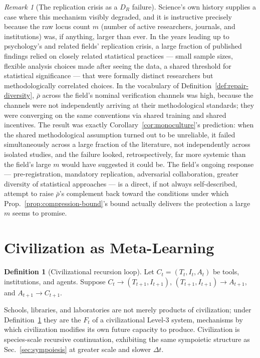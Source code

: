 \documentclass[12pt,a4paper]{article}
\theoremstyle{plain}
\theoremstyle{definition}
\newtheorem{definition}[theorem]{Definition}
\theoremstyle{remark}
\newtheorem{remark}[theorem]{Remark}
\newcommand{\DR}{D_R}
\begin{document}
\begin{remark}[The replication crisis as a $\DR$ failure]
\label{rem:replication-crisis}
Science's own history supplies a case where this mechanism visibly degraded, and it is instructive precisely because the raw locus count $m$ (number of active researchers, journals, and institutions) was, if anything, larger than ever. In the years leading up to psychology's and related fields' replication crisis, a large fraction of published findings relied on closely related statistical practices — small sample sizes, flexible analysis choices made after seeing the data, a shared threshold for statistical significance — that were formally distinct researchers but methodologically correlated choices. In the vocabulary of Definition~\ref{def:repair-diversity}, $\bar\rho$ across the field's nominal verification channels was high, because the channels were not independently arriving at their methodological standards; they were converging on the same conventions via shared training and shared incentives. The result was exactly Corollary~\ref{cor:monoculture}'s prediction: when the shared methodological assumption turned out to be unreliable, it failed simultaneously across a large fraction of the literature, not independently across isolated studies, and the failure looked, retrospectively, far more systemic than the field's large $m$ would have suggested it could be. The field's ongoing response — pre-registration, mandatory replication, adversarial collaboration, greater diversity of statistical approaches — is a direct, if not always self-described, attempt to raise $\bar\rho$'s complement back toward the conditions under which Prop.~\ref{prop:compression-bound}'s bound actually delivers the protection a large $m$ seems to promise.
\end{remark}

\section{Civilization as Meta-Learning}
\label{sec:civilization}

\begin{definition}[Civilizational recursion loop]
\label{def:civ-loop}
Let $C_t = (T_t, I_t, A_t)$ be tools, institutions, and agents. Suppose $C_t \to (T_{t+1}, I_{t+1})$, $(T_{t+1},I_{t+1}) \to A_{t+1}$, and $A_{t+1} \to C_{t+1}$.
\end{definition}

Schools, libraries, and laboratories are not merely products of civilization; under Definition~\ref{def:civ-loop} they are the $F_t$ of a civilizational Level-3 system, mechanisms by which civilization modifies its own future capacity to produce. Civilization is species-scale recursive continuation, exhibiting the same sympoietic structure as Sec.~\ref{sec:sympoiesis} at greater scale and slower $\Delta t$.
\end{document}
